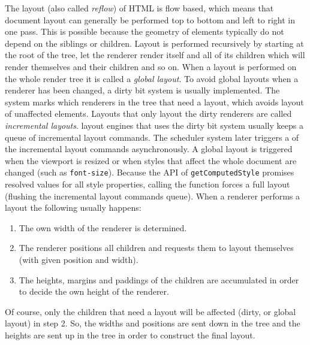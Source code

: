 \documentclass[a4paper,11pt]{kth-mag}
\newcommand{\code}[1]{\texttt{#1}}
\begin{document}
        The layout (also called \emph{reflow}) of \gls{HTML} is flow based, which means that \gls{document} layout can generally be performed top to bottom and left to right in one pass.
        This is possible because the geometry of \glspl{element} typically do not depend on the siblings or children.
        Layout is performed recursively by starting at the root of the tree, let the renderer render itself and all of its children which will render themselves and their children and so on.
        When a layout is performed on the whole \gls{render tree} it is called a \emph{global layout}.
        To avoid global layouts when a renderer has been changed, a dirty bit system is usually implemented.
        The system marks which renderers in the tree that need a layout, which avoids layout of unaffected \glspl{element}.
        Layouts that only layout the dirty renderers are called \emph{incremental layouts}.
        \Glspl{layout engine} that uses the dirty bit system usually keeps a queue of incremental layout commands.
        The scheduler system later triggers a  of the incremental layout commands asynchronously.
        A global layout is triggered when the \gls{viewport} is resized or when styles that affect the whole \gls{document} are changed (such as \code{font-size}).
        Because the \gls{API} of \code{getComputedStyle} promises resolved values for all style properties, calling the function forces a full layout (flushing the incremental layout commands queue).
        When a renderer performs a layout the following usually happens:
        \begin{enumerate}
          \item The own width of the renderer is determined.
          \item The renderer positions all children and requests them to layout themselves (with given position and width).
          \item The heights, margins and paddings of the children are accumulated in order to decide the own height of the renderer.
        \end{enumerate}
        Of course, only the children that need a layout will be affected (dirty, or global layout) in step 2.
        So, the widths and positions are sent down in the tree and the heights are sent up in the tree in order to construct the final layout.
\end{document}
